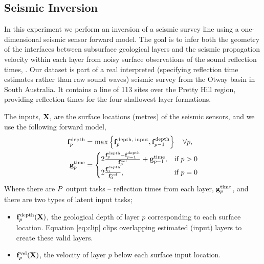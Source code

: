 \subsection{Seismic Inversion}

In this experiment we perform an inversion of a seismic survey line using a
one-dimensional seismic sensor forward model. The goal is to infer both the
geometry of the interfaces between subsurface geological layers and the
seismic propagation velocity within each layer from noisy surface observations
of the sound reflection times, \Outs. 
Our dataset is part of a real interpreted (specifying reflection time
estimates rather than raw sound waves) seismic survey from the Otway basin in
South Australia.  It contains a line of 113 sites over the Pretty Hill region,
providing reflection times for the four shallowest layer formations.

The inputs, $\mathbf{X}$, are the surface locations (metres) of the seismic sensors,
and we use the following forward model,
\begin{align}
    \mathbf{f}_p^\text{depth} &= \max\left\{{\mathbf{f}_p^\text{depth, input},
        \mathbf{f}_{p-1}^\text{depth}}\right\} \quad \forall p, \label{eq:clip} \\
    \mathbf{g}_p^\text{time} &=
    \begin{cases}
        2\frac{\mathbf{f}_p^\text{depth} - \mathbf{f}_{p-1}^\text{depth}}
        {\mathbf{f}_p^\text{vel}} + \mathbf{g}_{p-1}^\text{time},
        & \text{if } p > 0 \\
        2\frac{\mathbf{f}_0^\text{depth}}{\mathbf{f}_0^\text{vel}},
        & \text{if } p = 0
    \end{cases}
\end{align}
Where there are $P$ output tasks -- reflection times from each layer,
$\mathbf{g}_p^\text{time}$, and there are two types of latent input tasks;
\begin{itemize}
    \item $\mathbf{f}_p^\text{depth}\!\left({\mathbf{X}}\right)$, the geological depth of layer
        $p$ corresponding to each surface location. Equation \eqref{eq:clip} 
        clips overlapping estimated (input) layers to create these valid
        layers.
    \item $\mathbf{f}_p^\text{vel}\!\left({\mathbf{X}}\right)$, the velocity of layer $p$ 
        below each surface input location.
\end{itemize}

